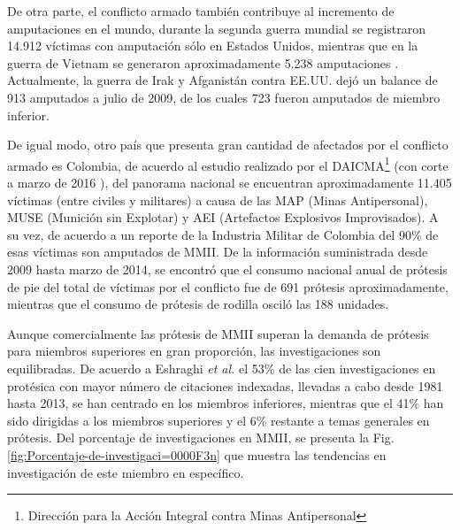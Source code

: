 \documentclass[12pt,english]{article}
\begin{document}
De otra parte, el conflicto armado también contribuye al incremento
de amputaciones en el mundo, durante la segunda guerra mundial se
registraron 14.912 víctimas con amputación sólo en Estados Unidos,
mientras que en la guerra de Vietnam se generaron aproximadamente
5.238 amputaciones \cite{Laferrier2010a}. Actualmente, la guerra
de Irak y Afganistán contra EE.UU. dejó un balance de 913 amputados
a julio de 2009, de los cuales 723 fueron amputados de miembro inferior\cite{Fergason2010}. 

De igual modo, otro país que presenta gran cantidad de afectados por
el conflicto armado es Colombia, de acuerdo al estudio realizado por
el DAICMA\footnote{Dirección para la Acción Integral contra Minas Antipersonal}
(con corte a marzo de 2016 \cite{PAICMA}), del panorama nacional
se encuentran aproximadamente 11.405 víctimas (entre civiles y militares)
a causa de las MAP (Minas Antipersonal), MUSE (Munición sin Explotar)
y AEI (Artefactos Explosivos Improvisados). A su vez, de acuerdo a
un reporte de la Industria Militar de Colombia \cite{Prieto2014}
del 90\% de esas víctimas son amputados de MMII. De la información
suministrada desde 2009 hasta marzo de 2014, se encontró que el consumo
nacional anual de prótesis de pie del total de víctimas por el conflicto
fue de 691 prótesis aproximadamente, mientras que el consumo de prótesis
de rodilla osciló las 188 unidades.

Aunque comercialmente las prótesis de MMII superan la demanda de prótesis
para miembros superiores en gran proporción, las investigaciones son
equilibradas. De acuerdo a Eshraghi \emph{et al.}\cite{Eshraghi2013}
el 53\% de las cien investigaciones en protésica con mayor número
de citaciones indexadas, llevadas a cabo desde 1981 hasta 2013, se
han centrado en los miembros inferiores, mientras que el 41\% han
sido dirigidas a los miembros superiores y el 6\% restante a temas
generales en prótesis. Del porcentaje de investigaciones en MMII,
se presenta la Fig. \ref{fig:Porcentaje-de-investigaci=0000F3n} que
muestra las tendencias en investigación de este miembro en específico.
\end{document}
